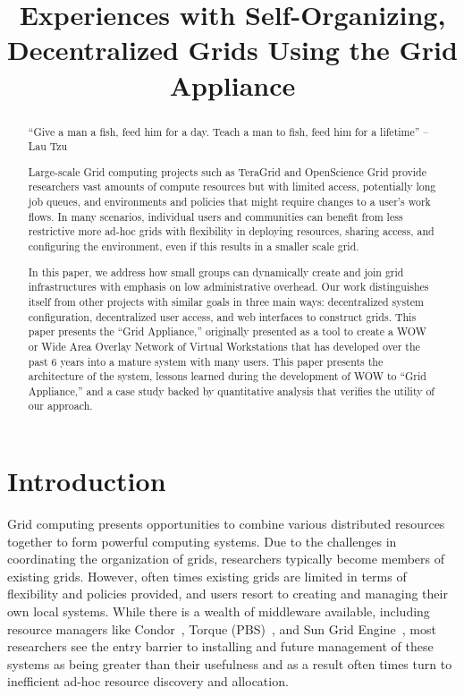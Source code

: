 \documentclass[conference]{IEEEtran}
\begin{document}
\title{Experiences with Self-Organizing, Decentralized Grids Using the Grid
Appliance}

\author{
}

\maketitle


\begin{abstract}

``Give a man a fish, feed him for a day.  Teach a man to fish, feed him for a
lifetime'' -- Lau Tzu

Large-scale Grid computing projects such as TeraGrid and OpenScience Grid
provide researchers vast amounts of compute resources but with limited access,
potentially long job queues, and environments and policies that might require
changes to a user's work flows. In many scenarios, individual users and
communities can benefit from less restrictive more ad-hoc grids with
flexibility in deploying resources, sharing access, and configuring the
environment, even if this results in a smaller scale grid.

In this paper, we address how small groups can dynamically create and join grid
infrastructures with emphasis on low administrative overhead.  Our work
distinguishes itself from other projects with similar goals in three main ways:
decentralized system configuration, decentralized user access, and web
interfaces to construct grids.  This paper presents the ``Grid Appliance,''
originally presented as a tool to create a WOW or Wide Area Overlay Network of
Virtual Workstations that has developed over the past 6 years into a mature
system with many users.  This paper presents the architecture of the system,
lessons learned during the development of WOW to ``Grid Appliance,'' and a case
study backed by quantitative analysis that verifies the utility of our
approach.  

\end{abstract}

\section{Introduction}

Grid computing presents opportunities to combine various distributed resources
together to form powerful computing systems.  Due to the challenges in
coordinating the organization of grids, researchers typically become members of
existing grids. However, often times existing grids are limited in terms of
flexibility and policies provided, and users resort to creating and managing
their own local systems.  While there is a wealth of middleware available,
including resource managers like Condor~\cite{condor0}, Torque
(PBS)~\cite{torque}, and Sun Grid Engine~\cite{grid_engine}, most researchers
see the entry barrier to installing and future management of these systems as
being greater than their usefulness and as a result often times turn to
inefficient ad-hoc resource discovery and allocation.
\end{document}
